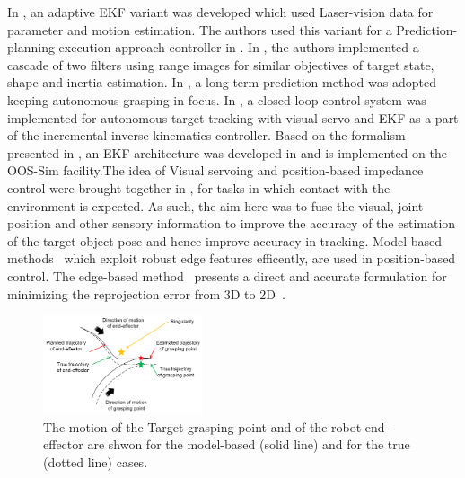 In \cite{Aghili07}, an adaptive EKF variant was developed which used Laser-vision data for parameter and motion estimation. The authors used this variant for a Prediction-planning-execution approach controller in \cite{Aghili08}. In \cite{Dubowsky}, the authors implemented a cascade of two filters using range images for similar objectives of target state, shape and inertia estimation. In \cite{DLR01}, a long-term prediction method was adopted keeping autonomous grasping in focus. In \cite{RIS0}, a closed-loop control system was implemented for autonomous target tracking with visual servo and EKF as a part of the incremental inverse-kinematics controller. Based on the formalism presented in \cite{Aghili07}, an EKF architecture was developed in \cite{Selfthesis} and is implemented on the OOS-Sim facility.The idea of Visual servoing and position-based impedance control were brought together in \cite{Lippiello}, for tasks in which contact with the environment is expected. As such, the aim here was to fuse the visual, joint position and other sensory information to improve the accuracy of the estimation of the target object pose and hence improve accuracy in tracking. Model-based methods~\cite{Comport2004, Drummond2002} which exploit robust edge features efficently, are used in position-based control. The edge-based method~\cite{Drummond2002} presents a direct and accurate formulation for minimizing the reprojection error from 3D to 2D~\cite{Oumer2015}. 
%
%
%
%
%
\begin{figure}[t!]
\centering\includegraphics[angle=0,width=0.42\textwidth]{./figures/Motivation_Image}
\caption{The motion of the Target grasping point and of the robot end-effector are shwon for the model-based (solid line) and for the true (dotted line) cases.}
\label{fig:motivation}
\end{figure}
%
